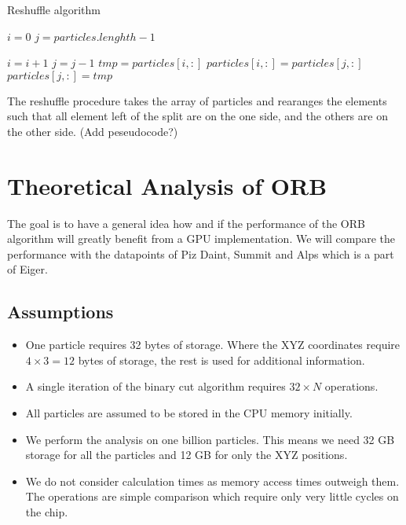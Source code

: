 \documentclass[]{article}
\begin{document}
\begin{algorithm}[H]
	\caption{Reshuffle algorithm}\label{euclid}
	\begin{algorithmic}[1]
		\State $i = 0$
		\State $j = particles.lenghth - 1$
		
			\State $i = i + 1$
			\State $j = j - 1$
			\Else
			\State $tmp = particles[i,:]$
			\State $particles[i,:] = particles[j,:]$
			\State $particles[j,:] = tmp$
			\EndIf
		\EndWhile\label{euclidendwhile}
		
		\EndProcedure
	\end{algorithmic}
\end{algorithm}

The reshuffle procedure takes the array of particles and rearanges the elements such that all element left of the split are on the one side, and the others are on the other side. (Add peseudocode?)

\section{Theoretical Analysis of ORB}

The goal is to have a general idea how and if the performance of the ORB algorithm will greatly benefit from a GPU implementation. We will compare the performance with the datapoints of Piz Daint, Summit and Alps which is a part of Eiger. 

\subsection{Assumptions} 
\begin{itemize}
	\item 
	One particle requires 32 bytes of storage. Where the XYZ coordinates require $4\times3 = 12$ bytes of storage, the rest is used for additional information.
	
	\item
	A single iteration of the binary cut algorithm requires $32 \times N$ operations.
	
	\item 
	All particles are assumed to be stored in the CPU memory initially.
	
	\item
	We perform the analysis on one billion particles. This means we need 32 GB storage for all the particles and 12 GB for only the XYZ positions.
	
	\item
	We do not consider calculation times as memory access times  outweigh them. The operations are simple comparison  which require only very little cycles on the chip. 
\end{itemize}
\end{document}
